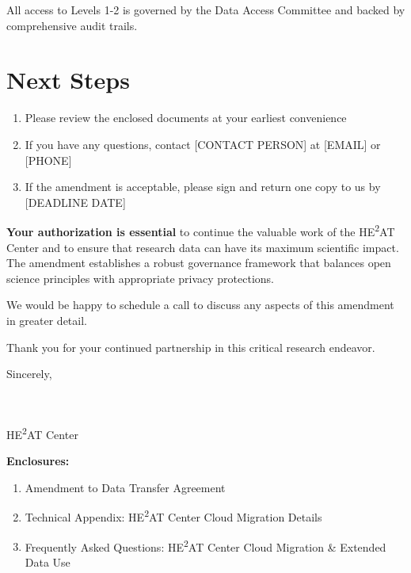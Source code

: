 \documentclass[12pt,letterpaper]{article}
\begin{document}
All access to Levels 1-2 is governed by the Data Access Committee and backed by comprehensive audit trails.

\section*{Next Steps}

\begin{enumerate}
\item Please review the enclosed documents at your earliest convenience
\item If you have any questions, contact [CONTACT PERSON] at [EMAIL] or [PHONE]
\item If the amendment is acceptable, please sign and return one copy to us by [DEADLINE DATE]
\end{enumerate}

\textbf{Your authorization is essential} to continue the valuable work of the HE\textsuperscript{2}AT Center and to ensure that research data can have its maximum scientific impact. The amendment establishes a robust governance framework that balances open science principles with appropriate privacy protections.

We would be happy to schedule a call to discuss any aspects of this amendment in greater detail.

Thank you for your continued partnership in this critical research endeavor.

\vspace{1cm}

Sincerely,

\vspace{1.5cm}

\noindent [NAME]\\
\noindent [TITLE]\\
\noindent HE\textsuperscript{2}AT Center\\

\vspace{1cm}

\noindent \textbf{Enclosures:}
\begin{enumerate}
\item Amendment to Data Transfer Agreement
\item Technical Appendix: HE\textsuperscript{2}AT Center Cloud Migration Details
\item Frequently Asked Questions: HE\textsuperscript{2}AT Center Cloud Migration \& Extended Data Use
\end{enumerate}
\end{document}
